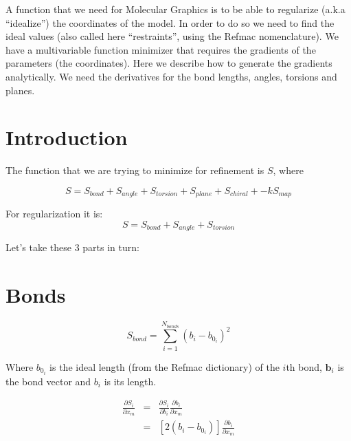 
A function that we need for Molecular Graphics is to be able to
regularize (a.k.a ``idealize'') the coordinates of the model.  In
order to do so we need to find the ideal values (also called here
``restraints'', using the Refmac nomenclature).  We have a
multivariable function minimizer that requires the gradients of the
parameters (the coordinates).  Here we describe how to generate the
gradients analytically.  We need the derivatives for the bond lengths,
angles, torsions and planes.

\section{Introduction}

The function that we are trying to minimize for refinement is $S$, where

\begin{displaymath}
  S = S_{bond} + S_{angle} + S_{torsion} + S_{plane} + S_{chiral} + -kS_{map}
\end{displaymath}

For regularization it is:
\begin{displaymath}
  S = S_{bond} + S_{angle} + S_{torsion}
\end{displaymath}



Let's take these 3 parts in turn:


\section{Bonds}

\begin{displaymath}
  S_{bond} = \sum_{i=1}^{N_{bonds}} {(b_i - b_{0_i})^2}
\end{displaymath}

Where $b_{0_i}$ is the ideal length (from the Refmac dictionary) of
the $i$th bond, $\mathbf{b}_i$ is the bond vector and $b_i$ is its length.

\begin{eqnarray*}
  \label{eq:1}
  \frac{\partial S_i}{\partial x_m} & = & \frac{\partial S_i}{\partial b_i} 
  \frac{\partial b_i}{\partial x_m} \\
   & = & [2(b_i - b_{0_i})]   \frac{\partial b_i}{\partial x_m}
\end{eqnarray*}


